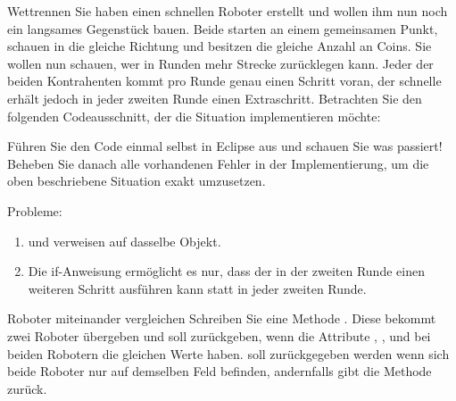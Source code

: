 \documentclass{../tuda-exercise}
\begin{document}
  \begin{task}[credit=\stars{1}{3}]{Wettrennen}
    Sie haben einen schnellen Roboter  erstellt und wollen ihm nun noch ein
    langsames Gegenstück  bauen. Beide starten an einem gemeinsamen Punkt,
    schauen in die gleiche Richtung und besitzen die gleiche Anzahl an Coins. Sie wollen nun
    schauen, wer in  Runden mehr Strecke zurücklegen kann. Jeder der beiden
    Kontrahenten kommt pro Runde genau einen Schritt voran, der schnelle  erhält
    jedoch in jeder zweiten Runde einen Extraschritt. Betrachten Sie den folgenden
    Codeausschnitt, der die Situation implementieren möchte:

    

    Führen Sie den Code einmal selbst in Eclipse aus und schauen Sie was passiert! Beheben Sie
    danach alle vorhandenen Fehler in der Implementierung, um die oben beschriebene Situation
    exakt umzusetzen.

    \begin{solution}
      Probleme:
      \begin{enumerate}
        \item {} und  verweisen auf dasselbe Objekt.
        \item Die \textcolor{keywordcolor}{if}-Anweisung ermöglicht es nur, dass der
         in der zweiten Runde einen weiteren Schritt ausführen kann statt in
        jeder zweiten Runde.
      \end{enumerate}
      
    \end{solution}
  \end{task}

  \clearpagesolution

  \begin{task}[credit=\stars{1}{3}]{Roboter miteinander vergleichen}
    Schreiben Sie eine Methode . Diese bekommt zwei
    Roboter übergeben und soll  zurückgeben, wenn die Attribute ,
    ,  und  bei beiden Robotern die
    gleichen Werte haben.  soll zurückgegeben werden wenn sich beide Roboter nur
    auf demselben Feld befinden, andernfalls gibt die Methode  zurück.

    \begin{solution}
      
    \end{solution}
  \end{task}
\end{document}
